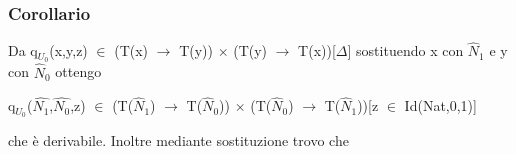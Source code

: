\subsubsection{Corollario}
Da q$_{U_0}$(x,y,z) $\in$ (T(x) $\rightarrow$ T(y)) $\times$ (T(y) $\rightarrow$ T(x))[$\Delta$] sostituendo x con $\hat{N}_1$ e y con $\hat{N}_0$ ottengo \begin{center} q$_{U_0}$($\hat{N_1}$,$\hat{N_0}$,z) $\in$ (T($\hat{N}_1$) $\rightarrow$ T($\hat{N}_0$)) $\times$ (T($\hat{N}_0$) $\rightarrow$ T($\hat{N}_1$))[z $\in$ Id(Nat,0,1)] \end{center} che \`e derivabile. Inoltre mediante sostituzione trovo che
\scriptsize
\begin{adjustwidth}{-5em}{}
\begin{prooftree}
\end{prooftree}
\end{adjustwidth}

